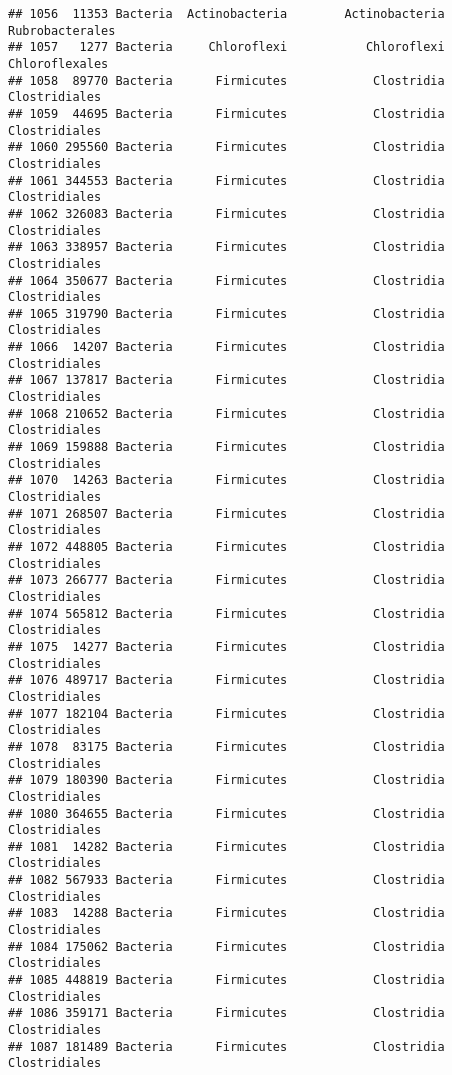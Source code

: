 \documentclass[
]{article}
\begin{document}
\begin{verbatim}
## 1056  11353 Bacteria  Actinobacteria        Actinobacteria     Rubrobacterales
## 1057   1277 Bacteria     Chloroflexi           Chloroflexi      Chloroflexales
## 1058  89770 Bacteria      Firmicutes            Clostridia       Clostridiales
## 1059  44695 Bacteria      Firmicutes            Clostridia       Clostridiales
## 1060 295560 Bacteria      Firmicutes            Clostridia       Clostridiales
## 1061 344553 Bacteria      Firmicutes            Clostridia       Clostridiales
## 1062 326083 Bacteria      Firmicutes            Clostridia       Clostridiales
## 1063 338957 Bacteria      Firmicutes            Clostridia       Clostridiales
## 1064 350677 Bacteria      Firmicutes            Clostridia       Clostridiales
## 1065 319790 Bacteria      Firmicutes            Clostridia       Clostridiales
## 1066  14207 Bacteria      Firmicutes            Clostridia       Clostridiales
## 1067 137817 Bacteria      Firmicutes            Clostridia       Clostridiales
## 1068 210652 Bacteria      Firmicutes            Clostridia       Clostridiales
## 1069 159888 Bacteria      Firmicutes            Clostridia       Clostridiales
## 1070  14263 Bacteria      Firmicutes            Clostridia       Clostridiales
## 1071 268507 Bacteria      Firmicutes            Clostridia       Clostridiales
## 1072 448805 Bacteria      Firmicutes            Clostridia       Clostridiales
## 1073 266777 Bacteria      Firmicutes            Clostridia       Clostridiales
## 1074 565812 Bacteria      Firmicutes            Clostridia       Clostridiales
## 1075  14277 Bacteria      Firmicutes            Clostridia       Clostridiales
## 1076 489717 Bacteria      Firmicutes            Clostridia       Clostridiales
## 1077 182104 Bacteria      Firmicutes            Clostridia       Clostridiales
## 1078  83175 Bacteria      Firmicutes            Clostridia       Clostridiales
## 1079 180390 Bacteria      Firmicutes            Clostridia       Clostridiales
## 1080 364655 Bacteria      Firmicutes            Clostridia       Clostridiales
## 1081  14282 Bacteria      Firmicutes            Clostridia       Clostridiales
## 1082 567933 Bacteria      Firmicutes            Clostridia       Clostridiales
## 1083  14288 Bacteria      Firmicutes            Clostridia       Clostridiales
## 1084 175062 Bacteria      Firmicutes            Clostridia       Clostridiales
## 1085 448819 Bacteria      Firmicutes            Clostridia       Clostridiales
## 1086 359171 Bacteria      Firmicutes            Clostridia       Clostridiales
## 1087 181489 Bacteria      Firmicutes            Clostridia       Clostridiales

\end{verbatim}
\end{document}
